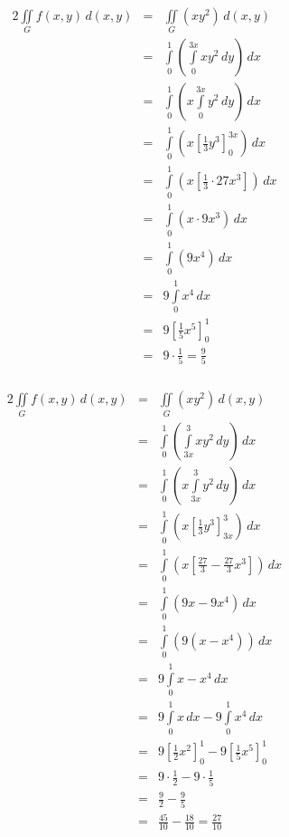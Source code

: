 \documentclass[10pt,a4paper,oneside,ngerman,numbers=noenddot]{scrartcl}
\begin{document}
\subsubsection{} %
\begin{alignat*}{2}
\iint\limits_{G} f(x,y) \, d(x,y) &=& \iint\limits_{G} (xy^{2}) \, d(x,y) \\
&=& \int\limits_{0}^{1} \left(\int\limits_{0}^{3x} xy^{2}\, dy \right) \, dx \\
&=& \int\limits_{0}^{1} \left(x\int\limits_{0}^{3x} y^{2}\, dy \right) \, dx \\
&=& \int\limits_{0}^{1} \left(x \left[\frac{1}{3}y^{3} \right]_{0}^{3x} \right) \, dx \\
&=& \int\limits_{0}^{1} \left(x \left[\frac{1}{3} \cdot 27x^{3} \right] \right) \, dx \\
&=&  \int\limits_{0}^{1} \left(x \cdot 9x^{3} \right) \, dx \\
&=&  \int\limits_{0}^{1} \left(9x^{4} \right) \, dx \\
&=& 9\int\limits_{0}^{1} x^{4} \, dx \\
&=& 9\left[\frac{1}{5}x^{5} \right]_{0}^{1} \\
&=& 9 \cdot \frac{1}{5} = \frac{9}{5}
\end{alignat*}
\subsubsection{} %
\begin{alignat*}{2}
\iint\limits_{G} f(x,y) \, d(x,y) &=& \iint\limits_{G} (xy^{2}) \, d(x,y) \\
&=& \int\limits_{0}^{1} \left(\int\limits_{3x}^{3} xy^{2} \, dy \right)\, dx \\
&=& \int\limits_{0}^{1} \left(x\int\limits_{3x}^{3} y^{2} \, dy \right)\, dx \\
&=& \int\limits_{0}^{1} \left(x \left[\frac{1}{3}y^{3} \right]_{3x}^{3} \right)\, dx \\
&=& \int\limits_{0}^{1} \left(x \left[\frac{27}{3} - \frac{27}{3}x^{3} \right] \right)\, dx \\
&=& \int\limits_{0}^{1} \left(9x - 9x^{4} \right)\, dx \\
&=& \int\limits_{0}^{1} \left(9(x - x^{4}) \right)\, dx \\
&=& 9\int\limits_{0}^{1} x - x^{4}\, dx \\
&=& 9\int\limits_{0}^{1} x \, dx - 9\int\limits_{0}^{1} x^{4}\, dx \\
&=& 9 \left[\frac{1}{2}x^{2} \right]_{0}^{1} - 9\left[\frac{1}{5}x^{5} \right]_{0}^{1} \\
&=& 9  \cdot \frac{1}{2} - 9 \cdot \frac{1}{5} \\
&=& \frac{9}{2} - \frac{9}{5} \\
&=& \frac{45}{10} - \frac{18}{10} = \frac{27}{10}
\end{alignat*}
\end{document}
